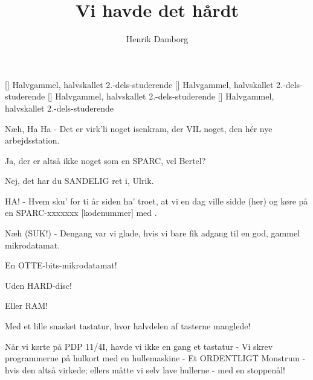 \documentclass[a4paper,11pt]{article}
\title{Vi havde det hårdt}
\author{Henrik Damborg}
\begin{document}
\maketitle

\begin{roles}
[] Halvgammel, halvskallet 2.-dels-studerende 
[] Halvgammel, halvskallet 2.-dels-studerende 
[] Halvgammel, halvskallet 2.-dels-studerende 
[] Halvgammel, halvskallet 2.-dels-studerende 
\end{roles}

\begin{sketch}



 Næh, Ha Ha - Det er virk'li noget isenkram, der VIL noget, den hér nye arbejdsstation.

 Ja, der er altså ikke noget som en SPARC, vel Bertel?

 Nej, det har du SANDELIG ret i, Ulrik.

 HA! - Hvem sku' for ti år siden ha' troet, at vi en dag ville sidde (her) og køre på en SPARC-xxxxxxx [kodenummer] med
         .


 Næh (SUK!) - Dengang var vi glade, hvis vi bare fik adgang til en god, gammel mikrodatamat.

 En OTTE-bits-mikrodatamat!

 Uden HARD-disc!

 Eller RAM! 


 Med et lille snasket tastatur, hvor halvdelen af tasterne manglede!

 Når vi kørte på PDP 11/4I, havde vi ikke en gang et tastatur - Vi skrev programmerne på hulkort med en hullemaskine -
         Et ORDENTLIGT Monstrum - hvis den altså virkede; ellers måtte vi selv lave hullerne - med en stoppenål!



\end{sketch}
\end{document}
